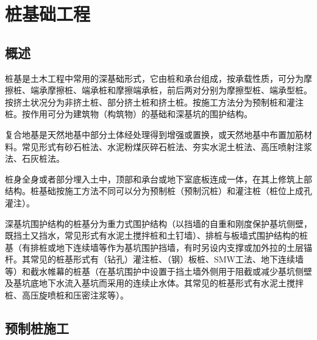 \documentclass{book}
\begin{document}
\chapter{桩基础工程}
\section{概述}
\par 桩基是土木工程中常用的深基础形式，它由桩和承台组成，按承载性质，可分为摩擦桩、端承摩擦桩、端承桩和摩擦端承桩，前后两对分别为摩擦型桩、端承型桩。按挤土状况分为非挤土桩、部分挤土桩和挤土桩。按施工方法分为预制桩和灌注桩。按作用可分为建筑物（构筑物）的基础和深基坑的围护结构。
\par 复合地基是天然地基中部分土体经处理得到增强或置换，或天然地基中布置加筋材料。常见形式有砂石桩法、水泥粉煤灰碎石桩法、夯实水泥土桩法、高压喷射注浆法、石灰桩法。
\par 桩身全身或者部分埋入土中，顶部和承台或地下室底板连成一体，在其上修筑上部结构。桩基础按施工方法不同可以分为预制桩（预制沉桩）和灌注桩（桩位上成孔灌注）。
\par 深基坑围护结构的桩基分为重力式围护结构（以挡墙的自重和刚度保护基坑侧壁，既挡土又挡水，常见形式有水泥土搅拌桩和土钉墙）、排桩与板墙式围护结构的桩基（有排桩或地下连续墙等作为基坑围护挡墙，有时另设内支撑或加外拉的土层锚杆。其常见的桩基形式有（钻孔）灌注桩、（钢）板桩、SMW工法、地下连续墙等）和截水帷幕的桩基（在基坑围护中设置于挡土墙外侧用于阻截或减少基坑侧壁及基坑底地下水流入基坑而采用的连续止水体。其常见的桩基形式有水泥土搅拌桩、高压旋喷桩和压密注浆等）。
\section{预制桩施工}
\end{document}
